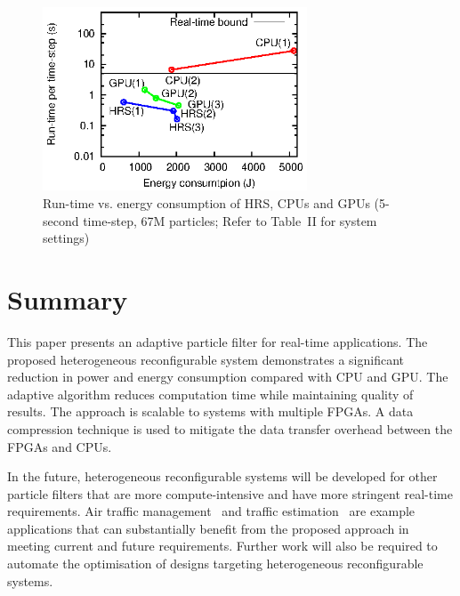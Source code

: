 \begin{figure}[t!]
\centering
\includegraphics[width=0.7\textwidth]{runtime_reconfiguration/figures/fig_scale}
\caption{Run-time vs. energy consumption of HRS, CPUs and GPUs (5-second time-step, 67M particles; Refer to Table~II for system settings)}
\label{fig:scale}
\end{figure}


\section{Summary}

This paper presents an adaptive particle filter for real-time applications.
The proposed heterogeneous reconfigurable system demonstrates a significant reduction in power and energy consumption compared with CPU and GPU.
The adaptive algorithm reduces computation time while maintaining quality of results. 
The approach is scalable to systems with multiple FPGAs.
A data compression technique is used to mitigate the data transfer overhead between the FPGAs and CPUs.

In the future, heterogeneous reconfigurable systems will be developed for other particle filters that are more compute-intensive and have more stringent real-time requirements.
Air traffic management~\cite{chau13b} and traffic estimation~\cite{mihaylova07} are example applications that can substantially benefit from the proposed approach in meeting current and future requirements.
Further work will also be required to automate the optimisation of designs targeting heterogeneous reconfigurable systems.



